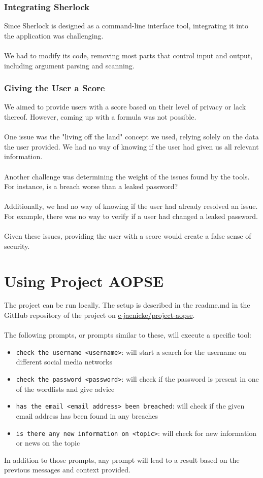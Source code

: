 \documentclass[
    a4paper,
    pagesize,
	pdftex,
    12pt,
]{scrartcl}
\begin{document}
\subsubsection{Integrating Sherlock}
Since Sherlock is designed as a command-line interface tool, integrating it into the application was challenging.
\\ \\
We had to modify its code, removing most parts that control input and output, including argument parsing and scanning.

\subsubsection{Giving the User a Score}
We aimed to provide users with a score based on their level of privacy or lack thereof.  However, coming up with a formula was not possible.
\\ \\
One issue was the "living off the land" concept we used, relying solely on the data the user provided. We had no way of knowing if the user had given us all relevant information.
\\ \\
Another challenge was determining the weight of the issues found by the tools. For instance, is a breach worse than a leaked password?
\\ \\
Additionally, we had no way of knowing if the user had already resolved an issue. For example, there was no way to verify if a user had changed a leaked password.
\\ \\
Given these issues, providing the user with a score would create a false sense of security.

\section{Using Project AOPSE}
The project can be run locally. The setup is described in the readme.md in the GitHub repository of the project on \hyperlink{https://github.com/c-jaenicke/project-aopse}{c-jaenicke/project-aopse}.
\\ \\
The following prompts, or prompts similar to these, will execute a specific tool:
\begin{itemize}
	\item \lstinline[breaklines]|check the username <username>|: will start a search for the username on different social media networks
	\item \lstinline[breaklines]|check the password <password>|: will check if the password is present in one of the wordlists and give advice
	\item \lstinline[breaklines]|has the email <email address> been breached|: will check if the given email address has been found in any breaches
	\item \lstinline[breaklines]|is there any new information on <topic>|: will check for new information or news on the topic
\end{itemize}
In addition to those prompts, any prompt will lead to a result based on the previous messages and context provided.
\end{document}
